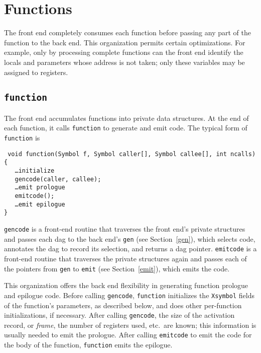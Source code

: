 \section{Functions}

The front end completely consumes each function before passing any part
of the function to the back end.  This organization permits certain
optimizations.  For example, only by processing complete functions can
the front end identify the locals and parameters whose address is not taken; only
these variables may be assigned to registers.

\subsection{\tt function}

\label{function}

The front end accumulates functions into private data structures.  At
the end of each function, it calls \verb|function| to generate and emit
code. The typical form of \verb|function| is
\begin{flushleft}\tt
\verb|void function(Symbol f, Symbol caller[], Symbol callee[], int ncalls) {| \\
\ \ \ \ldots {\rm initialize} \\
\ \ \ gencode(caller, callee); \\
\ \ \ \ldots {\rm emit prologue} \\
\ \ \ emitcode(); \\
\ \ \ \ldots {\rm emit epilogue} \\
\verb|}|
\end{flushleft}
\verb|gencode| is a front-end routine that traverses the front end's
private structures and passes each dag to the back end's \verb|gen|
(see Section~\ref{gen}), which selects code, annotates the dag to
record its selection, and returns a dag pointer. \verb|emitcode| is a
front-end routine that traverses the private structures again and
passes each of the pointers from \verb|gen| to \verb|emit| (see
Section~\ref{emit}), which emits the code.

This organization offers the back end flexibility in
generating function prologue and epilogue code.
Before calling \verb|gencode|, \verb|function| initializes
the \verb|Xsymbol| fields of the function's parameters, as described
below, and does other per-function initializations, if necessary.
After calling \verb|gencode|, the size of the activation record,
or {\em frame}, the number of registers used, etc.\ are known;
this information is usually needed to emit the prologue.
After calling \verb|emitcode| to emit the code for the body of the function,
\verb|function| emits the epilogue.

